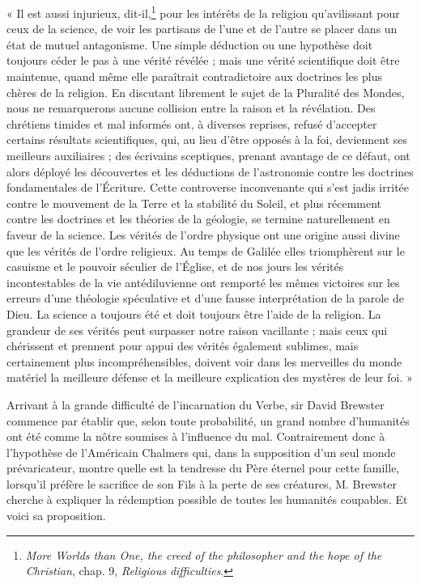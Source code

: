\documentclass[a4paper, 11pt, oneside]{article}
\begin{document}
« Il est aussi injurieux, dit-il,\footnote{\emph{More Worlds than One, the creed of the philosopher and the hope of the Christian}, chap. 9, \emph{Religious difficulties}.} pour les intérêts de la religion qu'avilissant pour ceux de la science, de voir les partisans de l'une et de l'autre se placer dans un état de mutuel antagonisme. Une simple déduction ou une hypothèse doit toujours céder le pas à une vérité révélée ; mais une vérité scientifique doit être maintenue, quand même elle paraîtrait contradictoire aux doctrines les plus chères de la religion. En discutant librement le sujet de la Pluralité des Mondes, nous ne remarquerons aucune collision entre la raison et la révélation. Des chrétiens timides et mal informés ont, à diverses reprises, refusé d'accepter certains résultats scientifiques, qui, au lieu d'être opposés à la foi, deviennent ses meilleurs auxiliaires ; des écrivains sceptiques, prenant avantage de ce défaut, ont alors déployé les découvertes et les déductions de l'astronomie contre les doctrines fondamentales de l'Écriture. Cette controverse inconvenante qui s'est jadis irritée contre le mouvement de la Terre et la stabilité du Soleil, et plus récemment contre les doctrines et les théories de la géologie, se termine naturellement en faveur de la science. Les vérités de l'ordre physique ont une origine aussi divine que les vérités de l'ordre religieux. Au temps de Galilée elles triomphèrent sur le casuisme et le pouvoir séculier de l'Église, et de nos jours les vérités incontestables de la vie antédiluvienne ont remporté les mêmes victoires sur les erreurs d'une théologie spéculative et d'une fausse interprétation de la parole de Dieu. La science a toujours été et doit toujours être l'aide de la religion. La grandeur de ses vérités peut surpasser notre raison vacillante ; mais ceux qui chérissent et prennent pour appui des vérités également sublimes, mais certainement plus incompréhensibles, doivent voir dans les merveilles du monde matériel la meilleure défense et la meilleure explication des mystères de leur foi. »

Arrivant à la grande difficulté de l'incarnation du Verbe, sir David Brewster commence par établir que, selon toute probabilité, un grand nombre d'humanités ont été comme la nôtre soumises à l'influence du mal. Contrairement donc à l'hypothèse de l'Américain Chalmers qui, dans la supposition d'un seul monde prévaricateur, montre quelle est la tendresse du Père éternel pour cette famille, lorsqu'il préfère le sacrifice de son Fils à la perte de ses créatures, M. Brewster cherche à expliquer la rédemption possible de toutes les humanités coupables. Et voici sa proposition.
\end{document}
